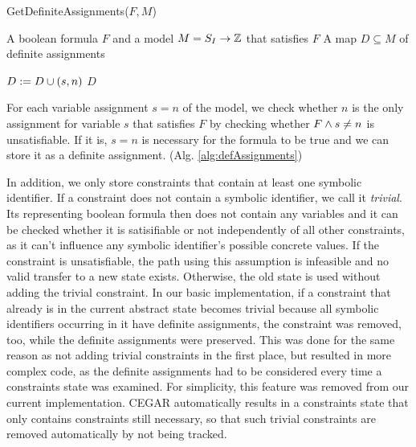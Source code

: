 \begin{algorithm}
\caption{GetDefiniteAssignments($F, M$)}
\label{alg:defAssignments}
\begin{algorithmic}
\Input A boolean formula $F$ and a model $M = S_I \rightarrow \mathbb{Z}$ that satisfies $F$
\Output A map $D\subseteq M$ of definite assignments

	\State $D := D \cup (s, n)$
\EndIf
\EndFor
\Return $D$
\end{algorithmic}
\end{algorithm}
For each variable assignment $s = n$ of the model,
we check whether $n$ is the only assignment for variable $s$ that satisfies $F$ by checking whether $F \wedge s \neq n$ is unsatisfiable.
If it is, $s = n$ is necessary for the formula to be true and we can store it as a definite assignment. (Alg. \ref{alg:defAssignments})

In addition, we only store constraints that contain at least one symbolic identifier.
If a constraint does not contain a symbolic identifier, we call it \emph{trivial}.
Its representing boolean formula then does not contain any variables and it can be checked whether it is satisifiable or not independently of all other constraints, as it can't influence any symbolic identifier's possible concrete values.
If the constraint is unsatisfiable, the path using this assumption is infeasible and no valid transfer to a new state exists.
Otherwise, the old state is used without adding the trivial constraint.
In our basic implementation, if a constraint that already is in the current abstract state becomes trivial because all symbolic identifiers occurring in it have definite assignments, the constraint was removed, too, while the definite assignments were preserved.
This was done for the same reason as not adding trivial constraints in the first place, but resulted in more complex code, as the definite assignments had to be considered every time a constraints state was examined.
For simplicity, this feature was removed from our current implementation. CEGAR automatically results in a constraints state that only contains constraints still necessary, so that such trivial constraints are removed automatically by not being tracked.

